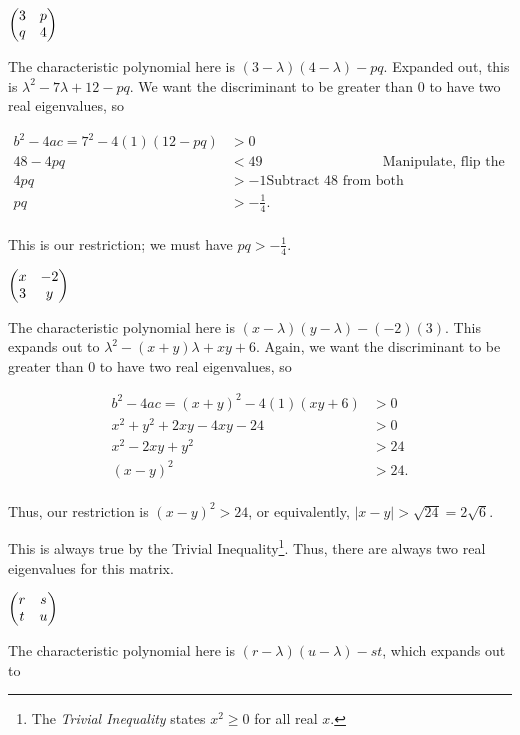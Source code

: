 \documentclass[../gatm_answers.tex]{subfiles}
\begin{document}
\begin{iinner_problem}[start=1]
\item $\begin{pmatrix} 3 & p \\ q & 4 \end{pmatrix}$
\end{iinner_problem}

The characteristic polynomial here is $(3-\lambda)(4-\lambda)-pq$. Expanded out, this is $\lambda^2 - 7\lambda + 12 - pq$. We want the discriminant to be greater than $0$ to have two real eigenvalues, so

\begin{align*}
b^2-4ac=7^2-4(1)(12-pq) &> 0 \\
48-4pq &< 49 & \text{Manipulate, flip the inequality}\\
4pq &> -1 \text{Subtract 48 from both sides}\\
pq &> -\frac{1}{4}. \\
\end{align*}

This is our restriction; we must have $pq>-\frac{1}{4}$.

\begin{iinner_problem}
\item $\begin{pmatrix} x & -2 \\ 3 & y \end{pmatrix}$
\end{iinner_problem}

The characteristic polynomial here is $(x-\lambda)(y-\lambda)-(-2)(3)$. This expands out to $\lambda^2 - (x+y)\lambda + xy + 6$. Again, we want the discriminant to be greater than $0$ to have two real eigenvalues, so

\begin{align*}
b^2-4ac=(x+y)^2-4(1)(xy+6) &> 0 \\
x^2 + y^2 + 2xy - 4xy - 24 &> 0 \\
x^2 - 2xy + y^2 &> 24 \\
(x-y)^2 &> 24. \\
\end{align*}

Thus, our restriction is $(x-y)^2 > 24$, or equivalently, $|x-y| > \sqrt{24} = 2\sqrt{6}.$

This is always true by the Trivial Inequality\footnote{The \textit{Trivial Inequality} states $x^2\geq 0$ for all real $x$.}. Thus, there are always two real eigenvalues for this matrix.

\begin{iinner_problem}
\item $\begin{pmatrix} r & s \\ t & u \end{pmatrix}$
\end{iinner_problem}

The characteristic polynomial here is $(r-\lambda)(u-\lambda)-st$, which expands out to
\end{document}
